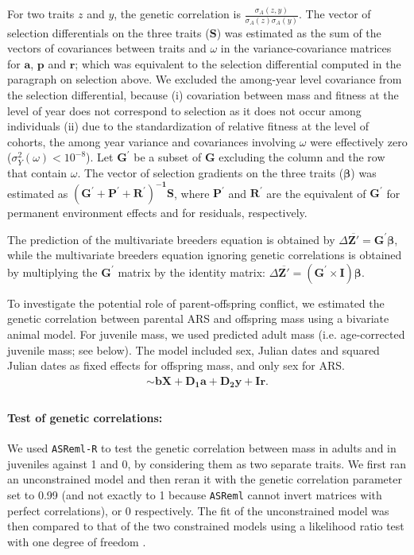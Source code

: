 For two traits $z$ and $y$, the genetic correlation is $\frac{\sigma_{A}(z,y)}{\sigma_{A}(z)\sigma_{A}(y)}$.
The vector of selection differentials on the three traits ($\boldsymbol{S}$) was estimated as the sum of the vectors of covariances between traits and $\omega$ in the variance-covariance matrices for $\boldsymbol{a}$, $\boldsymbol{p}$ and $\boldsymbol{r}$; which was equivalent to the selection differential computed in the paragraph on selection above. We excluded the among-year level covariance from the selection differential, because (i) covariation between mass and fitness at the level of year does not correspond to selection as it does not occur among individuals (ii) due to the standardization of relative fitness at the level of cohorts, the among year variance and covariances involving $\omega$ were effectively zero ($\sigma_{Y}^2(\omega)<10^{-8}$). 
Let $\boldsymbol{G^\prime}$ be a subset of $\boldsymbol{G}$ excluding the column and the row that contain $\omega$.
The vector of selection gradients on the three traits ($\boldsymbol{\beta}$) was estimated as $\boldsymbol{(G^\prime+P^\prime+R^\prime)^{-1}S}$, where $\boldsymbol{P^\prime}$ and $\boldsymbol{R^\prime}$ are the equivalent of $\boldsymbol{G^\prime}$ for permanent environment effects and for residuals, respectively.

The prediction of the multivariate breeders equation is obtained by $\Delta \overline{\boldsymbol{Z'}}=\boldsymbol{G^\prime \beta}$, while the multivariate breeders equation ignoring genetic correlations is obtained by multiplying the $\boldsymbol{G^\prime}$ matrix by the identity matrix\parencite{Morrissey2012constraints}: $\Delta \overline{\boldsymbol{Z'}}=\boldsymbol{(G^\prime \times I)\beta}$.

To investigate the potential role of parent-offspring conflict, we estimated the genetic correlation between parental ARS and offspring mass using a bivariate animal model. For juvenile mass, we used predicted adult mass (i.e. age-corrected juvenile mass; see below). The model included sex, Julian dates and squared Julian dates as fixed effects for offspring mass, and only sex for ARS. 
\begin{align*}
[\boldsymbol{m_O},
\boldsymbol{ARS_P}]
\sim
\boldsymbol{bX}+\boldsymbol{D_1a}+\boldsymbol{D_2y}+\boldsymbol{Ir.}\\
\end{align*}

\paragraph{Test of genetic correlations: }
We used \verb+ASReml-R+ \parencite{Gilmour2014, Butler2009} to test the genetic correlation between mass in adults and in juveniles against 1 and 0, by considering them as two separate traits. We first ran an unconstrained model and then reran it with the genetic correlation parameter set to 0.99 (and not exactly to 1 because \verb+ASReml+ cannot invert matrices with perfect correlations), or 0 respectively. The fit of the unconstrained model was then compared to that of the two constrained models using a likelihood ratio test with one degree of freedom \parencite{Wilson2009}.

